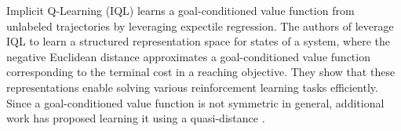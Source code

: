 Implicit Q-Learning (IQL) \cite{ghosh2023reinforcementlearningpassivedata, kostrikov2021offlinereinforcementlearningimplicit,xu2023policyguidedimitationapproachoffline} learns a goal-conditioned value function from unlabeled trajectories by leveraging expectile regression. The authors of \cite{hilp} leverage IQL to learn a structured representation space for states of a system, where the negative Euclidean distance approximates a goal-conditioned value function corresponding to the terminal cost in a reaching objective. They show that these representations enable solving various reinforcement learning tasks efficiently. Since a goal-conditioned value function is not symmetric in general, additional work has proposed learning it using a quasi-distance \cite{wang2023optimalgoalreachingreinforcementlearning}. 

